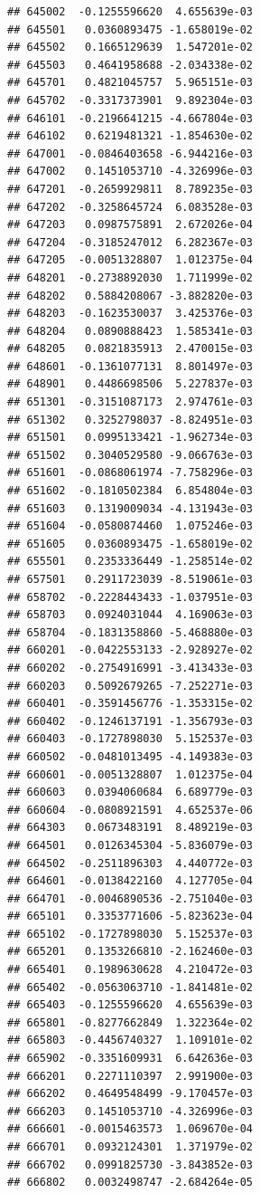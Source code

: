\documentclass[ignorenonframetext,]{beamer}
\begin{document}
\begin{frame}[fragile]
\begin{verbatim}
## 645002  -0.1255596620  4.655639e-03
## 645501   0.0360893475 -1.658019e-02
## 645502   0.1665129639  1.547201e-02
## 645503   0.4641958688 -2.034338e-02
## 645701   0.4821045757  5.965151e-03
## 645702  -0.3317373901  9.892304e-03
## 646101  -0.2196641215 -4.667804e-03
## 646102   0.6219481321 -1.854630e-02
## 647001  -0.0846403658 -6.944216e-03
## 647002   0.1451053710 -4.326996e-03
## 647201  -0.2659929811  8.789235e-03
## 647202  -0.3258645724  6.083528e-03
## 647203   0.0987575891  2.672026e-04
## 647204  -0.3185247012  6.282367e-03
## 647205  -0.0051328807  1.012375e-04
## 648201  -0.2738892030  1.711999e-02
## 648202   0.5884208067 -3.882820e-03
## 648203  -0.1623530037  3.425376e-03
## 648204   0.0890888423  1.585341e-03
## 648205   0.0821835913  2.470015e-03
## 648601  -0.1361077131  8.801497e-03
## 648901   0.4486698506  5.227837e-03
## 651301  -0.3151087173  2.974761e-03
## 651302   0.3252798037 -8.824951e-03
## 651501   0.0995133421 -1.962734e-03
## 651502   0.3040529580 -9.066763e-03
## 651601  -0.0868061974 -7.758296e-03
## 651602  -0.1810502384  6.854804e-03
## 651603   0.1319009034 -4.131943e-03
## 651604  -0.0580874460  1.075246e-03
## 651605   0.0360893475 -1.658019e-02
## 655501   0.2353336449 -1.258514e-02
## 657501   0.2911723039 -8.519061e-03
## 658702  -0.2228443433 -1.037951e-03
## 658703   0.0924031044  4.169063e-03
## 658704  -0.1831358860 -5.468880e-03
## 660201  -0.0422553133 -2.928927e-02
## 660202  -0.2754916991 -3.413433e-03
## 660203   0.5092679265 -7.252271e-03
## 660401  -0.3591456776 -1.353315e-02
## 660402  -0.1246137191 -1.356793e-03
## 660403  -0.1727898030  5.152537e-03
## 660502  -0.0481013495 -4.149383e-03
## 660601  -0.0051328807  1.012375e-04
## 660603   0.0394060684  6.689779e-03
## 660604  -0.0808921591  4.652537e-06
## 664303   0.0673483191  8.489219e-03
## 664501   0.0126345304 -5.836079e-03
## 664502  -0.2511896303  4.440772e-03
## 664601  -0.0138422160  4.127705e-04
## 664701  -0.0046890536 -2.751040e-03
## 665101   0.3353771606 -5.823623e-04
## 665102  -0.1727898030  5.152537e-03
## 665201   0.1353266810 -2.162460e-03
## 665401   0.1989630628  4.210472e-03
## 665402  -0.0563063710 -1.841481e-02
## 665403  -0.1255596620  4.655639e-03
## 665801  -0.8277662849  1.322364e-02
## 665803  -0.4456740327  1.109101e-02
## 665902  -0.3351609931  6.642636e-03
## 666201   0.2271110397  2.991900e-03
## 666202   0.4649548499 -9.170457e-03
## 666203   0.1451053710 -4.326996e-03
## 666601  -0.0015463573  1.069670e-04
## 666701   0.0932124301  1.371979e-02
## 666702   0.0991825730 -3.843852e-03
## 666802   0.0032498747 -2.684264e-05

\end{verbatim}
\end{frame}
\end{document}
